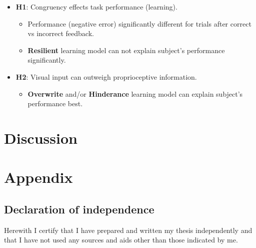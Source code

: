 \documentclass[man]{apa7}
\begin{document}
    \begin{itemize}
        \item \textbf{H1}: Congruency effects task performance (learning).
        \begin{itemize}
            \item Performance (negative error) significantly different for trials after correct vs incorrect feedback.
            \item \textbf{Resilient} learning model can not explain subject's performance significantly.
        \end{itemize}
        \item \textbf{H2}: Visual input can outweigh proprioceptive information.
        \begin{itemize}
            \item \textbf{Overwrite} and/or \textbf{Hinderance} learning model can explain subject's performance best.
        \end{itemize}
    \end{itemize}

\section{Discussion}

\printbibliography
\newpage
\section{Appendix}

\subsection{Declaration of independence}

Herewith I certify that I have prepared and written my thesis independently and that I have not used any sources and aids other than those indicated by me.
\end{document}
